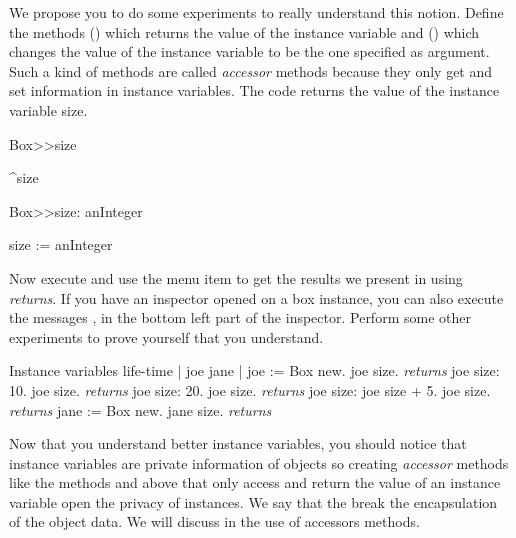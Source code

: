 We propose you to do some experiments to really understand this notion. 
Define the methods  () which returns the value 
of the instance variable  and  
() which changes the value of 
the instance variable  to be the one specified as argument. Such a kind of methods are called \emph{accessor} methods because they only get and set information in instance variables. 
The code  returns the value of the instance variable size.




\begin{method}\label{mt:size}
Box>>size

   ^size
\end{method}

\begin{method}\label{mt:sizeAssign}
Box>>size: anInteger

   size := anInteger
\end{method}


Now execute  and use the menu item
 to get the results we present in   using \emph{returns}. If you have an inspector opened
on a box instance, you can also execute the messages ,  in the bottom left part of the inspector. Perform some other experiments to prove yourself that you understand.

\begin{scriptwithtitle}{Instance variables 
life-time}\label{scr:instanceVarLife}
| joe jane |
joe := Box new.
joe size. \emph{returns} 
joe size: 10.
joe size. \emph{returns} 
joe size: 20.
joe size. \emph{returns} 
joe size: joe size + 5.
joe size. \emph{returns} 
jane := Box new.
jane size. \emph{returns} 
\end{scriptwithtitle}


Now that you understand better instance variables, you should notice that instance variables are private information of objects so creating \emph{accessor} methods like the methods and  above that only access and return the value of an instance variable open the privacy of instances. We say that the break the encapsulation of the object data. We will discuss in  the use of accessors methods.

